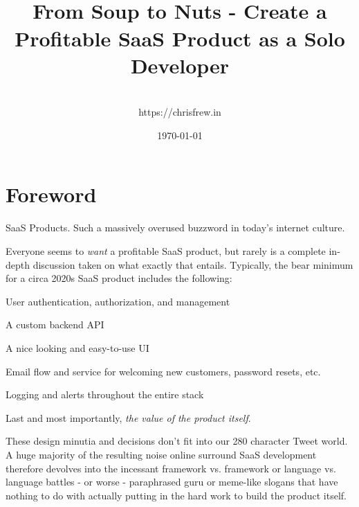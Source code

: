 \documentclass[a4paper,
                             oneside,
                             BCOR1.0cm,
                             DIV11,
                             parskip=full,
                             11pt]{scrbook}
\begin{document}
\title{\\\small{From Soup to Nuts - Create a Profitable SaaS Product as a Solo Developer}}
\author{
    \\https://chrisfrew.in
}
\date{\today}

\maketitle
\tableofcontents

\chapter*{Foreword}\label{cap:primer}


SaaS Products. Such a massively overused buzzword in today's internet culture. 

Everyone seems to \textit{want} a profitable SaaS product, but rarely is a complete in-depth discussion taken on what exactly that entails. Typically, the bear minimum for a circa 2020s SaaS product includes the following:

\begin{arrows}
\item User authentication, authorization, and management
\item A custom backend API
\item A nice looking and easy-to-use UI
\item Email flow and service for welcoming new customers, password resets, etc.
\item Logging and alerts throughout the entire stack
\item Last and most importantly, \textit{the value of the product itself}. 
\end{arrows}

These design minutia and decisions don't fit into our 280 character Tweet world. A huge majority of the resulting noise online surround SaaS development therefore devolves into the incessant framework vs. framework or language vs. language battles - or worse - paraphrased guru or meme-like slogans that have nothing to do with actually putting in the hard work to build the product itself.
\end{document}
